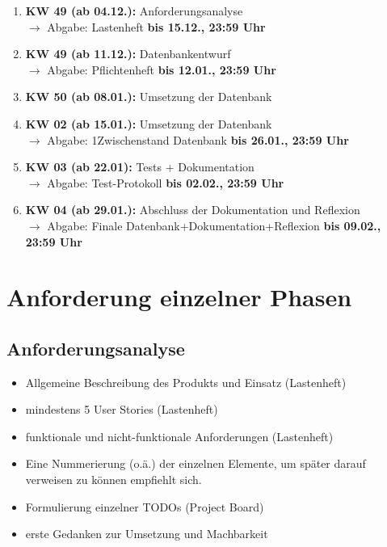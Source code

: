 \begin{enumerate}
    \item \textbf{KW 49 (ab 04.12.):} Anforderungsanalyse\\
       $\rightarrow$  Abgabe: Lastenheft \textbf{bis 15.12., 23:59 Uhr}
    \item \textbf{KW 49 (ab 11.12.):} Datenbankentwurf\\
       $\rightarrow$  Abgabe: Pflichtenheft \textbf{bis 12.01., 23:59 Uhr}
    \item \textbf{KW 50 (ab 08.01.):} Umsetzung der Datenbank
    \item \textbf{KW 02 (ab 15.01.):} Umsetzung der Datenbank\\
       $\rightarrow$  Abgabe: 1Zwischenstand Datenbank \textbf{bis 26.01., 23:59 Uhr}
    \item \textbf{KW 03 (ab 22.01):} Tests + Dokumentation\\
       $\rightarrow$  Abgabe: Test-Protokoll \textbf{bis 02.02., 23:59 Uhr}
    \item \textbf{KW 04 (ab 29.01.):} Abschluss der Dokumentation und Reflexion\\
       $\rightarrow$  Abgabe: Finale Datenbank+Dokumentation+Reflexion \textbf{bis 09.02., 23:59 Uhr}
\end{enumerate}

\section{Anforderung einzelner Phasen}

\subsection{Anforderungsanalyse}
\begin{itemize}
    \item Allgemeine Beschreibung des Produkts und Einsatz (Lastenheft)
    \item mindestens 5 User Stories (Lastenheft)
    \item funktionale und nicht-funktionale Anforderungen (Lastenheft)
    \item Eine Nummerierung (o.ä.) der einzelnen Elemente, um später darauf verweisen zu können empfiehlt sich.
    \item Formulierung einzelner TODOs (Project Board)
    \item erste Gedanken zur Umsetzung und Machbarkeit
\end{itemize}

